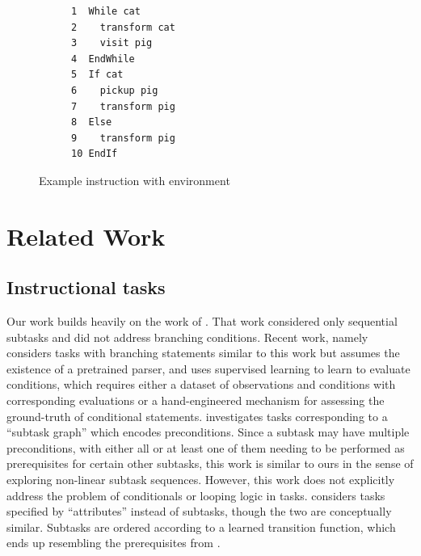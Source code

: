 \documentclass{article}
\begin{document}
\begin{figure}[t]
\vskip 0.2in
  \centering
  \begin{subfigure}{.2\columnwidth}
    \centering
  \end{subfigure}%
  \hfill
  \begin{subfigure}{.45\columnwidth}
    \centering
\begin{lstlisting}[]
1  While cat
2    transform cat
3    visit pig
4  EndWhile
5  If cat
6    pickup pig
7    transform pig
8  Else
9    transform pig
10 EndIf
\end{lstlisting}
  \end{subfigure}%
  \hfill
  \caption{Example instruction with environment}
\vskip -0.6in
\end{figure}

\section{Related Work}
\subsection{Instructional tasks}
Our work builds heavily on the work of \cite{oh2017zero}. That work considered
only sequential subtasks and did not address branching conditions. Recent work,
namely \cite{sun2020program} considers tasks with branching statements similar
to this work but assumes the existence of a pretrained parser, and uses
supervised learning to learn to evaluate conditions, which requires either a
dataset of observations and conditions with corresponding evaluations or a
hand-engineered mechanism for assessing the ground-truth of conditional
statements. \cite{sohn2018hierarchical} investigates tasks corresponding to a
``subtask graph'' which encodes preconditions. Since a subtask may have multiple
preconditions, with either all or at least one of them needing to be performed
as prerequisites for certain other subtasks, this work is similar to ours in the
sense of exploring non-linear subtask sequences. However, this work does not
explicitly address the problem of conditionals or looping logic in tasks.
\cite{zhang2018composable} considers tasks specified by ``attributes'' instead
of subtasks, though the two are conceptually similar. Subtasks are ordered
according to a learned transition function, which ends up resembling the
prerequisites from \cite{sohn2018hierarchical}. 
\end{document}
